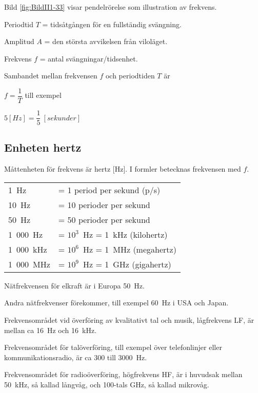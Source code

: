 Bild \ref{fig:BildII1-33} visar pendelrörelse som illustration av frekvens.

Periodtid \(T\) = tidsåtgången för en fullständig svängning.

Amplitud \(A\) = den största avvikelsen från viloläget.

Frekvens \(f\) = antal svängningar/tidsenhet.

\newpage

Sambandet mellan frekvensen \(f\) och periodtiden \(T\) är

\(f=\dfrac{1}{T}\) till exempel

\(5 [H z] = \dfrac{1}{5}\ [sekunder]\)

\subsection{Enheten hertz}

Måttenheten för frekvens är hertz [Hz].
I formler betecknas frekvensen med \(f\).

\begin{center}
\begin{tabular}{ll}
1~Hz      & = 1 period per sekund (p/s) \\
10~Hz     & = 10 perioder per sekund \\
50~Hz     & = 50 perioder per sekund \\
1~000~Hz  & = \(10^3\)~Hz = 1~kHz (kilohertz) \\
1~000~kHz & = \(10^6\)~Hz = 1~MHz (megahertz) \\
1~000~MHz & = \(10^9\)~Hz = 1~GHz (gigahertz) \\
\end{tabular}
\end{center}

Nätfrekvensen för elkraft är i Europa 50~Hz.

Andra nätfrekvenser förekommer, till exempel 60~Hz i USA och Japan.

Frekvensområdet vid överföring av kvalitativt tal och musik, lågfrekvens LF, är
mellan ca 16~Hz och 16~kHz.

Frekvensområdet för talöverföring, till exempel över telefonlinjer eller
kommunikationsradio, är ca 300 till 3000~Hz.

Frekvensområdet för radioöverföring, högfrekvens HF, är i huvudsak mellan
50~kHz, så kallad långvåg, och 100-tals GHz, så kallad mikrovåg.

